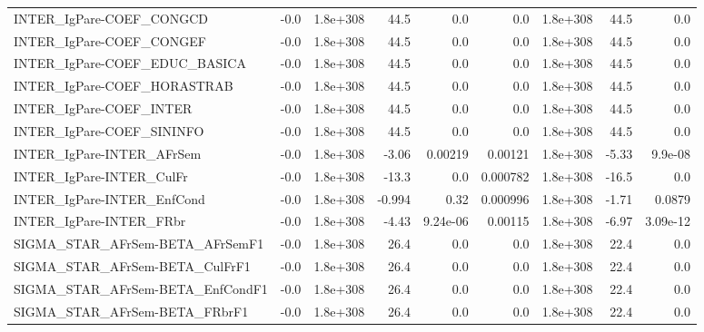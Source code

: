 \begin{tabular}{lrrrrrrrr}
INTER\_IgPare-COEF\_CONGCD             &        -0.0 &     1.8e+308 &    44.5 &      0.0 &        0.0 &    1.8e+308 &         44.5 &           0.0 \\
INTER\_IgPare-COEF\_CONGEF             &        -0.0 &     1.8e+308 &    44.5 &      0.0 &        0.0 &    1.8e+308 &         44.5 &           0.0 \\
INTER\_IgPare-COEF\_EDUC\_BASICA        &        -0.0 &     1.8e+308 &    44.5 &      0.0 &        0.0 &    1.8e+308 &         44.5 &           0.0 \\
INTER\_IgPare-COEF\_HORASTRAB          &        -0.0 &     1.8e+308 &    44.5 &      0.0 &        0.0 &    1.8e+308 &         44.5 &           0.0 \\
INTER\_IgPare-COEF\_INTER              &        -0.0 &     1.8e+308 &    44.5 &      0.0 &        0.0 &    1.8e+308 &         44.5 &           0.0 \\
INTER\_IgPare-COEF\_SININFO            &        -0.0 &     1.8e+308 &    44.5 &      0.0 &        0.0 &    1.8e+308 &         44.5 &           0.0 \\
INTER\_IgPare-INTER\_AFrSem            &        -0.0 &     1.8e+308 &   -3.06 &  0.00219 &    0.00121 &    1.8e+308 &        -5.33 &       9.9e-08 \\
INTER\_IgPare-INTER\_CulFr             &        -0.0 &     1.8e+308 &   -13.3 &      0.0 &   0.000782 &    1.8e+308 &        -16.5 &           0.0 \\
INTER\_IgPare-INTER\_EnfCond           &        -0.0 &     1.8e+308 &  -0.994 &     0.32 &   0.000996 &    1.8e+308 &        -1.71 &        0.0879 \\
INTER\_IgPare-INTER\_FRbr              &        -0.0 &     1.8e+308 &   -4.43 & 9.24e-06 &    0.00115 &    1.8e+308 &        -6.97 &      3.09e-12 \\
SIGMA\_STAR\_AFrSem-BETA\_AFrSemF1      &        -0.0 &     1.8e+308 &    26.4 &      0.0 &        0.0 &    1.8e+308 &         22.4 &           0.0 \\
SIGMA\_STAR\_AFrSem-BETA\_CulFrF1       &        -0.0 &     1.8e+308 &    26.4 &      0.0 &        0.0 &    1.8e+308 &         22.4 &           0.0 \\
SIGMA\_STAR\_AFrSem-BETA\_EnfCondF1     &        -0.0 &     1.8e+308 &    26.4 &      0.0 &        0.0 &    1.8e+308 &         22.4 &           0.0 \\
SIGMA\_STAR\_AFrSem-BETA\_FRbrF1        &        -0.0 &     1.8e+308 &    26.4 &      0.0 &        0.0 &    1.8e+308 &         22.4 &           0.0 \\

\end{tabular}
